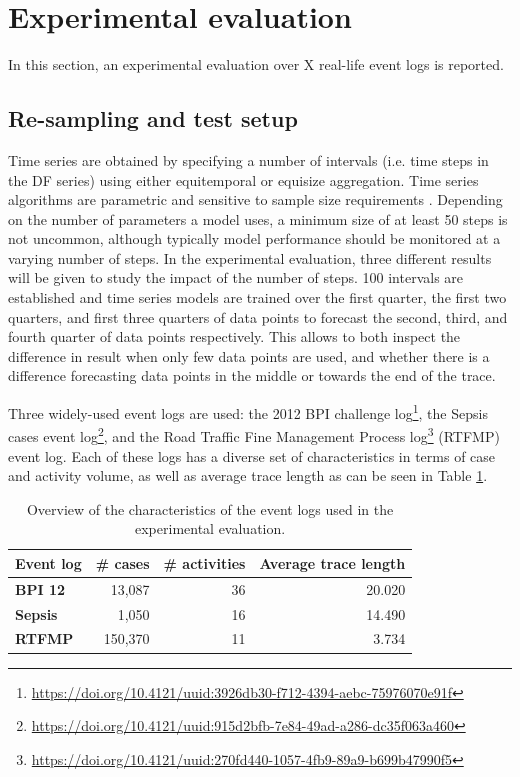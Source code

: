 \section{Experimental evaluation}\label{sec:experiment}
In this section, an experimental evaluation over X real-life event logs is reported.


\subsection{Re-sampling and test setup}
Time series are obtained by specifying a number of intervals (i.e. time steps in the DF series) using either equitemporal or equisize aggregation.
Time series algorithms are parametric and sensitive to sample size requirements \cite{hanke2001business}.
Depending on the number of parameters a model uses, a minimum size of at least 50 steps is not uncommon, although typically model performance should be monitored at a varying number of steps.
In the experimental evaluation, three different results will be given to study the impact of the number of steps. 
100 intervals are established and time series models are trained over the first quarter, the first two quarters, and first three quarters of data points to forecast the second, third, and fourth quarter of data points respectively.
This allows to both inspect the difference in result when only few data points are used, and whether there is a difference forecasting data points in the middle or towards the end of the trace.

Three widely-used event logs are used: the 2012 BPI challenge log\footnote{\url{https://doi.org/10.4121/uuid:3926db30-f712-4394-aebc-75976070e91f}}, the Sepsis cases event log\footnote{\url{https://doi.org/10.4121/uuid:915d2bfb-7e84-49ad-a286-dc35f063a460}}, and the Road Traffic Fine Management Process log\footnote{\url{https://doi.org/10.4121/uuid:270fd440-1057-4fb9-89a9-b699b47990f5}} (RTFMP) event log.
Each of these logs has a diverse set of characteristics in terms of case and activity volume, as well as average trace length as can be seen in Table \ref{tab:eventlogs}.
\begin{table}[htbp]
  \centering
    \begin{tabular}{lrrr}
    \toprule
    \textbf{Event log} & \multicolumn{1}{l}{\textbf{\# cases}} & \multicolumn{1}{l}{\textbf{\# activities}} & \multicolumn{1}{l}{\textbf{Average trace length}} \\
    \midrule
    \textbf{BPI 12} & 13,087 & 36    & 20.020 \\
    \textbf{Sepsis} & 1,050 & 16    & 14.490 \\
    \textbf{RTFMP} & 150,370 & 11    & 3.734 \\
    \bottomrule
    \end{tabular}%
  \caption{Overview of the characteristics of the event logs used in the experimental evaluation.}
  \label{tab:eventlogs}%
\end{table}%

